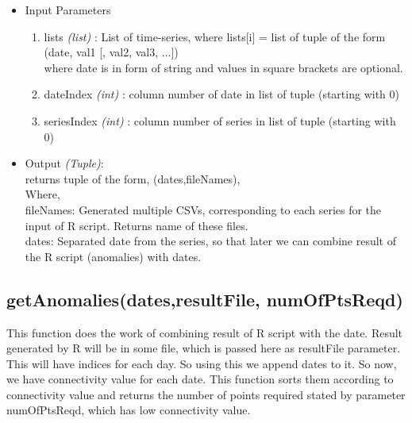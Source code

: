 \begin{itemize}
 \item Input Parameters
 
 \begin{enumerate}
  \item lists \textit{(list)} : List of time-series, where lists[i] = list of 
tuple of the form (date, val1 [, val2, val3, ...]) \\
    where date is in form of string and values in square brackets are optional.
  \item dateIndex \textit{(int)} : column number of date in list of tuple 
(starting with 0)
  \item seriesIndex \textit{(int)} : column number of series in list of tuple 
(starting with 0)

 \end{enumerate}

 \item Output \textit{(Tuple)}: \\
  returns tuple of the form, (dates,fileNames), \\
  
  Where, \\
  fileNames: Generated multiple CSVs, corresponding to each series for the 
input of R script. Returns name of these files. \\
  dates: Separated date from the series, so that later we can combine result of 
the R script (anomalies) with dates.

 
\end{itemize}


\subsection{getAnomalies(dates,resultFile, numOfPtsReqd)}

This function does the work of combining result of R script with the date. 
Result generated by R will be in some file, which is passed here as resultFile 
parameter. This will have indices for each day. So using this we append dates 
to it. So now, we have connectivity value for each date. This function sorts 
them according to connectivity value and returns the number of points required 
stated by parameter numOfPtsReqd, which has low connectivity value. 


